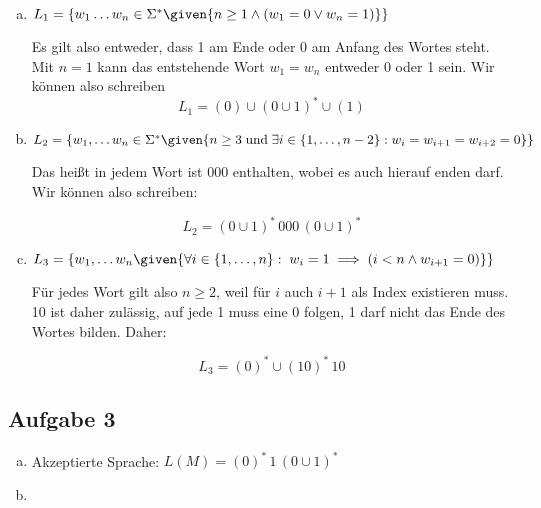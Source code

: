 \begin{enumerate}[a)]
\item $L_1 = \{ w_1 \ldots w_n \in \Sigma^{*} \given{n\geq 1 \land (w_1 = 0 \lor w_n = 1)} \} $

Es gilt also entweder, dass 1 am Ende oder 0 am Anfang des Wortes steht. Mit $n=1$ kann das entstehende Wort $w_1 = w_n$ entweder 0 oder 1 sein. Wir können also schreiben
\[ L_1 = (0) \cup (0 \cup 1)^{*} \cup (1) \]

\item $L_2 = \{w_1, \ldots w_n \in \Sigma^{*} \given{n\geq 3 \; \text{und} \; \exists i \in \{ 1, \ldots, n-2 \} : w_i = w_{i+1} = w_{i+2} = 0 } \}$

Das heißt in jedem Wort ist 000 enthalten, wobei es auch hierauf enden darf. Wir können also schreiben:

\[ L_2 = (0 \cup 1)^{*} \, 000 \, (0 \cup 1)^{*} \]

\item $ L_3 = \{ w_1, \ldots w_n \given{ \forall i \in \{1, \ldots, n\}: \; w_i = 1 \implies (i<n \land w_{i+1} = 0) } \} $

Für jedes Wort gilt also $n \geq 2$, weil für $i$ auch $i+1$ als Index existieren muss. 10 ist daher zulässig, auf jede 1 muss eine 0 folgen, 1 darf nicht das Ende des Wortes bilden. Daher:

\[ L_3 = (0)^{*} \cup (10)^{*} \, 10  \]

\end{enumerate}

\subsection*{Aufgabe 3}

\begin{enumerate}[a)]
  \item Akzeptierte Sprache: $L(M)= (0)^{*} \, 1 \, (0 \cup 1)^{*}  $\\
  \item

\end{enumerate}



